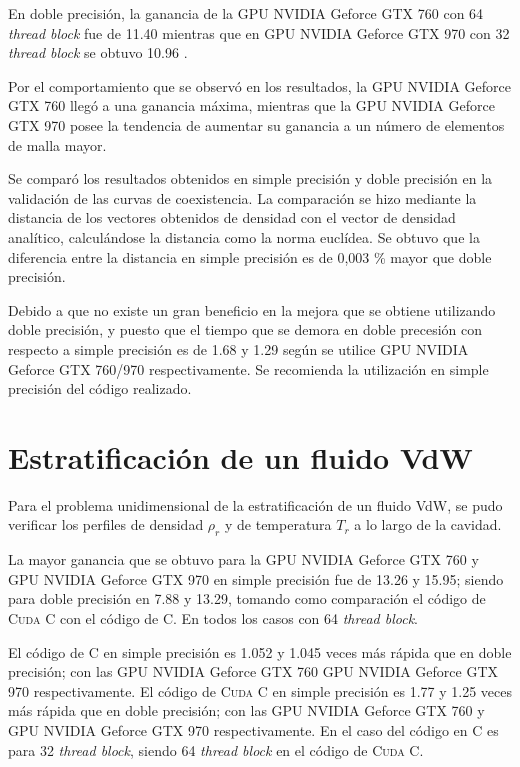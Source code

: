 En doble precisión, la ganancia de la GPU NVIDIA Geforce GTX 760 con 64 \textit{thread block} fue de 11.40 mientras que en GPU NVIDIA Geforce GTX 970 con 32 \textit{thread block} se obtuvo 10.96 .

Por el comportamiento que se observó en los resultados, la GPU NVIDIA Geforce GTX 760 llegó a una ganancia máxima, mientras que la GPU NVIDIA Geforce GTX 970 posee la tendencia de aumentar su ganancia a un número de elementos de malla mayor.

Se comparó los resultados obtenidos en simple precisión y doble precisión en la validación de las curvas de coexistencia. La comparación se hizo mediante la distancia de los vectores obtenidos de densidad con el vector de densidad analítico, calculándose la distancia como la norma euclídea. Se obtuvo que la diferencia entre la distancia en simple precisión es de 0,003 \% mayor que doble precisión.

Debido a que no existe un gran beneficio en la mejora que se obtiene utilizando doble precisión, y puesto que el tiempo que se demora en doble precesión con respecto a simple precisión es de 1.68 y 1.29 según se utilice GPU NVIDIA Geforce GTX 760/970 respectivamente. Se recomienda la utilización en simple precisión del código realizado.

\section{Estratificación de un fluido VdW}

Para el problema unidimensional de la estratificación de un fluido VdW, se pudo verificar los perfiles de densidad $\rho_r$ y de temperatura $T_r$ a lo largo de la cavidad. 

La mayor ganancia que se obtuvo para la GPU NVIDIA Geforce GTX 760 y GPU NVIDIA Geforce GTX 970 en simple precisión fue de 13.26 y 15.95; siendo para doble precisión en 7.88 y 13.29, tomando como comparación el código de \textsc{Cuda C} con el código de \textsc{C}. En todos los casos con 64 \textit{thread block}.

El código de \textsc{C} en simple precisión es 1.052 y 1.045 veces más rápida que en doble precisión; con las GPU NVIDIA Geforce GTX 760 GPU NVIDIA Geforce GTX 970 respectivamente. El código de \textsc{Cuda C} en simple precisión es 1.77 y 1.25 veces más rápida que en doble precisión; con las GPU NVIDIA Geforce GTX 760 y GPU NVIDIA Geforce GTX 970 respectivamente. En el caso del código en \textsc{C} es para 32 \textit{thread block}, siendo 64 \textit{thread block} en el código de \textsc{Cuda C}.

